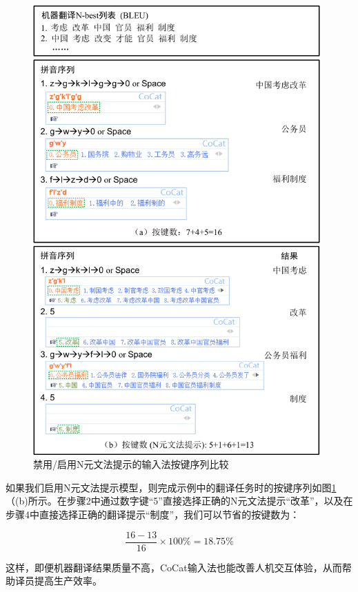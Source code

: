 \begin{figure}[hbp]
	\centering
	\includegraphics[width=0.98\textwidth]{Figure/Figure_3_4.pdf}
	\caption{禁用/启用N元文法提示的输入法按键序列比较}
	\label{Fig_cocat_enable_disable_prediction}
\end{figure}

如果我们启用N元文法提示模型，则完成示例中的翻译任务时的按键序列如图\ref{Fig_cocat_enable_disable_prediction}（(b)所示。在步骤2中通过数字键“5”直接选择正确的N元文法提示“改革”，以及在步骤4中直接选择正确的翻译提示“制度”，我们可以节省的按键数为：

$$\frac{16-13}{16} \times 100\% = 18.75\%$$

这样，即便机器翻译结果质量不高，CoCat输入法也能改善人机交互体验，从而帮助译员提高生产效率。

